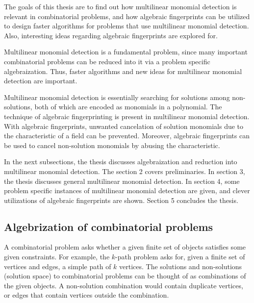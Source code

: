 The goals of this thesis are to find out how multilinear monomial detection is relevant in 
combinatorial problems, and how algebraic fingerprints can be utilized to design faster 
algorithms for problems that use multilinear monomial detection. Also, interesting ideas 
regarding algebraic fingerprints are explored for.

Multilinear monomial detection 
is a fundamental problem, since many important combinatorial problems can be reduced into it 
via a problem specific algebraization. Thus, faster algorithms and new ideas for multilinear monomial detection 
are important.

Multilinear monomial detection is essentially searching for solutions among non-solutions, 
both of which are encoded as monomials in a polynomial. 
The technique of algebraic fingerprinting is present in multilinear monomial detection. 
With algebraic fingerprints, unwanted cancelation of solution monomials due to the characteristic of a field can be prevented. 
Moreover, algebraic fingerprints can be used to cancel non-solution monomials by abusing the characteristic.

In the next subsections, the thesis discusses algebraization and reduction into multilinear monomial detection. 
The section 2 covers preliminaries. In section 3, the thesis discusses general multilinear monomial detection. 
In section 4, some problem specific instances of multilinear monomial detection are given, and clever 
utilizations of algebraic fingerprints are shown. Section 5 concludes the
thesis.

\subsection{Algebrization of combinatorial problems}

A combinatorial problem asks whether a given finite set of objects satisfies some given constraints. 
For example, the $k$-path problem asks for, given a finite set of vertices and edges, 
a simple path of $k$ vertices. The solutions and non-solutions (solution space) to combinatorial problems can be thought of as 
combinations of the given objects.
A non-solution combination would contain duplicate vertices, or edges that
contain vertices outside the combination.


